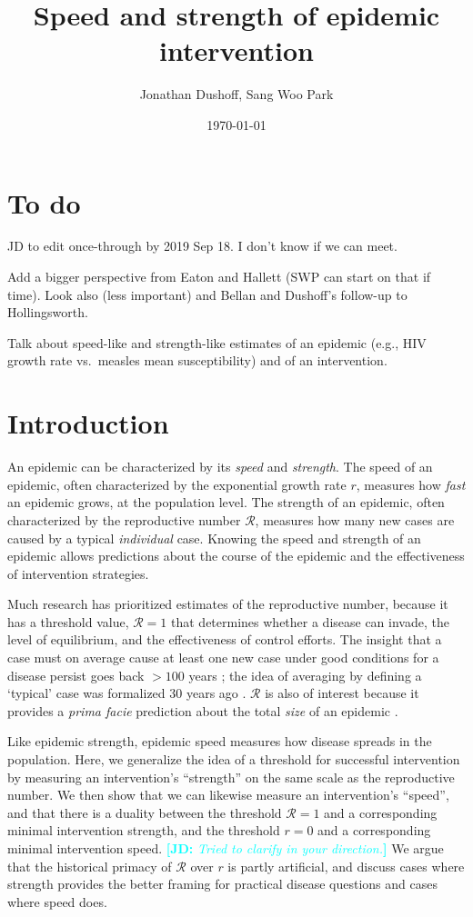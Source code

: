 \documentclass[12pt]{article}\usepackage[]{graphicx}\usepackage[]{color}
\title{Speed and strength of epidemic intervention}
\author{Jonathan Dushoff, Sang Woo Park}
\date{\today}
\newcommand{\comment}[3]{\textcolor{#1}{\textbf{[#2: }\textit{#3}\textbf{]}}}
\newcommand{\jd}[1]{\comment{cyan}{JD}{#1}}
\newcommand{\RR}{\ensuremath{{\mathcal R}}}
\begin{document}
\maketitle

\section{To do}

JD to edit once-through by 2019 Sep 18. I don't know if we can meet.

Add a bigger perspective from Eaton and Hallett (SWP can start on that if time). Look also (less important) and Bellan and Dushoff's follow-up to Hollingsworth.

Talk about speed-like and strength-like estimates of an epidemic (e.g., HIV growth rate vs.~measles mean susceptibility) and of an intervention.

\section{Introduction}

An epidemic can be characterized by its \emph{speed} and \emph{strength}.
The speed of an epidemic, often characterized by the exponential growth rate $r$, measures how \emph{fast} an epidemic grows, at the population level. 
The strength of an epidemic, often characterized by the reproductive number $\RR$, measures how many new cases are caused by a typical \emph{individual} case.
Knowing the speed and strength of an epidemic allows predictions about the course of the epidemic and the effectiveness of intervention strategies.

Much research has prioritized estimates of the reproductive number, because it has a threshold value, $\RR=1$ that determines whether a disease can invade, the level of equilibrium, and the effectiveness of control efforts. 
The insight that a case must on average cause at least one new case under good conditions for a disease persist goes back $>100$ years \citep{ross1911prevention};
the idea of averaging by defining a `typical' case was formalized 30 years ago \citep{diekmann1990definition}.
$\RR$ is also of interest because it provides a \emph{prima facie} prediction about the total \emph{size} of an epidemic \citep{anderson1991infectious, ma2006generality, miller2012note}. 

Like epidemic strength, epidemic speed measures how disease spreads in the population. 
Here, we generalize the idea of a threshold for successful intervention by measuring an intervention's ``strength'' on the same scale as the reproductive number. 
We then show that we can likewise measure an intervention's ``speed'', and that there is a duality between the threshold $\RR=1$ and a corresponding minimal intervention strength, and the threshold $r=0$ and a corresponding minimal intervention speed. \jd{Tried to clarify in your direction.}
We argue that the historical primacy of $\RR$ over $r$ is partly artificial, and discuss cases where strength provides the better framing for practical disease questions and cases where speed does.
\end{document}
